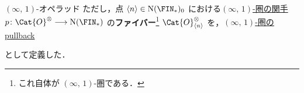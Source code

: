 \documentclass[TQFT_main]{subfiles}
\begin{document}
\begin{mydef}[label=def:infty-operad,breakable]{{$(\infty,\, 1)$}-オペラッド}
    ただし，点 $\expval{n} \in \mathrm{N}(\FIN_*)_0$ における\hyperref[def:infinity-1]{$(\infty,\, 1)$-圏の関手} $p \colon \Cat{O}^\otimes \lto \mathrm{N}(\FIN_*)$ の\textbf{ファイバー}\footnote{これ自体が $(\infty,\, 1)$-圏である．} $\Cat{O}^{\otimes}_{\expval{n}}$ を，\hyperref[def:pullback-infty]{$(\infty,\, 1)$-圏のpullback}
    \begin{center}
    \end{center}
    として定義した．
\end{mydef}
\end{document}
